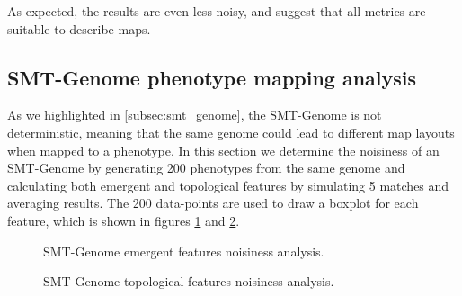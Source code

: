 As expected, the results are even less noisy, and suggest that all metrics are suitable to describe maps. 

\subsection{SMT-Genome phenotype mapping analysis}
\label{subsec:smt_genome_phenotype_mapping}
As we highlighted in \cref{subsec:smt_genome}, the SMT-Genome is not deterministic, meaning that the same genome could lead to different map layouts when mapped to a phenotype. In this section we determine the noisiness of an SMT-Genome by generating 200 phenotypes from the same genome and calculating both emergent and topological features by simulating 5 matches and averaging results. The 200 data-points are used to draw a boxplot for each feature, which is shown in figures \cref{fig:smt_genome_noisiness_emergent} and \cref{fig:smt_genome_noisiness_topology}.

\begin{figure}[hbt!]
    \centering
    \caption{SMT-Genome emergent features noisiness analysis.}
    \label{fig:smt_genome_noisiness_emergent}
\end{figure}
\begin{figure}[hbt!]
    \centering
    \caption{SMT-Genome topological features noisiness analysis.}
    \label{fig:smt_genome_noisiness_topology}
\end{figure}

